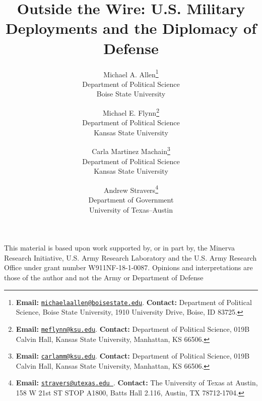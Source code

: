\documentclass[12pt]{book}
\begin{document}
\begin{titlepage}
	\title{Outside the Wire: U.S. Military Deployments and the Diplomacy of Defense \label{cha:min}}
	\author{Michael A. Allen\thanks{\textbf{Email:} \href{mailto:michaelaallen@boisestate.edu}{\tt michaelaallen@boisestate.edu}. \textbf{Contact:} Department of Political Science, Boise State University, 1910 University Drive, Boise, ID 83725.}\\
		Department of Political Science\\
		Boise State University \\
		\and Michael E. Flynn\thanks{\textbf{Email:} \href{mailto:meflynn@ksu.edu}{\tt meflynn@ksu.edu}. \textbf{Contact:} Department of Political Science, 019B Calvin Hall, Kansas State University, Manhattan, KS 66506.} \\
		Department of Political Science \\
		Kansas State University \\
		\and
		Carla Martinez Machain\thanks{\textbf{Email:} \href{mailto:carlamm@ksu.edu}{\tt carlamm@ksu.edu}. \textbf{Contact:} Department of Political Science, 019B Calvin Hall, Kansas State University, Manhattan, KS 66506.}\\
		Department of Political Science\\
		Kansas State University \\
		\and
		Andrew Stravers\thanks{\textbf{Email:} \href{mailto:stravers@utexas.edu }{\tt stravers@utexas.edu }. \textbf{Contact:} The University of Texas at Austin, 158 W 21st ST STOP A1800, Batts Hall 2.116, Austin, TX 78712-1704.}\\
		Department of Government\\
		University of Texas--Austin
	}
	
	\maketitle
	
	\noindent This material is based upon work supported by, or in part by, the Minerva Research Initiative, U.S. Army Research Laboratory and the U.S. Army Research Office under grant number W911NF-18-1-0087. Opinions and interpretations are those of the author and not the Army or Department of Defense
	\thispagestyle{empty}
\end{titlepage}



\frontmatter

\pagestyle{empty}
\end{document}
